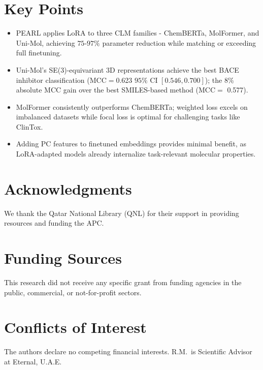 \documentclass[9pt,twocolumn,conference]{IEEEtran}
\begin{document}
\section*{Key Points}

\begin{itemize}
  \item PEARL applies LoRA to three CLM families - ChemBERTa, MolFormer, and Uni-Mol, achieving $75$-$97\%$ parameter reduction while matching or exceeding full finetuning.
  \item Uni-Mol's SE(3)-equivariant 3D representations achieve the best BACE inhibitor classification (MCC$=$0.623 $95\%$ CI $[0.546, 0.700]$); the 8\% absolute MCC gain over the best SMILES-based method (MCC$=$ 0.577).
  \item MolFormer consistently outperforms ChemBERTa; weighted loss excels on imbalanced datasets while focal loss is optimal for challenging tasks like ClinTox.
  \item Adding PC features to finetuned embeddings provides minimal benefit, as LoRA-adapted models already internalize task-relevant molecular properties.
\end{itemize}

\section*{Acknowledgments}
We thank the Qatar National Library (QNL) for their support in providing resources and funding the APC.

\section*{Funding Sources}
This research did not receive any specific grant from funding agencies in the public, commercial, or not-for-profit sectors.

\section*{Conflicts of Interest}
The authors declare no competing financial interests. R.M.\ is Scientific Advisor at Eternal, U.A.E.

\appendix
\end{document}
